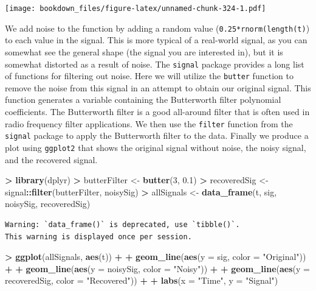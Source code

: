 \documentclass[]{krantz}
\makeatletter
\newenvironment{Shaded}{\begin{snugshade}}{\end{snugshade}}
\newcommand{\KeywordTok}[1]{\textcolor[rgb]{0.27,0.27,0.27}{\textbf{#1}}}
\newcommand{\DataTypeTok}[1]{\textcolor[rgb]{0.27,0.27,0.27}{#1}}
\newcommand{\DecValTok}[1]{\textcolor[rgb]{0.06,0.06,0.06}{#1}}
\newcommand{\FloatTok}[1]{\textcolor[rgb]{0.06,0.06,0.06}{#1}}
\newcommand{\StringTok}[1]{\textcolor[rgb]{0.5,0.5,0.5}{#1}}
\newcommand{\OperatorTok}[1]{\textcolor[rgb]{0.43,0.43,0.43}{\textbf{#1}}}
\newcommand{\NormalTok}[1]{#1}
\newenvironment{kframe}{%
\medskip{}
\setlength{\fboxsep}{.8em}
 \def\at@end@of@kframe{}%
 \ifinner\ifhmode%
  \def\at@end@of@kframe{\end{minipage}}%
  \begin{minipage}{\columnwidth}%
 \fi\fi%
 \def\FrameCommand##1{\hskip\@totalleftmargin \hskip-\fboxsep
 \colorbox{shadecolor}{##1}\hskip-\fboxsep
     \hskip-\linewidth \hskip-\@totalleftmargin \hskip\columnwidth}%
 \MakeFramed {\advance\hsize-\width
   \@totalleftmargin\z@ \linewidth\hsize
   \@setminipage}}%
 {\par\unskip\endMakeFramed%
 \at@end@of@kframe}
\renewenvironment{Shaded}{\begin{kframe}}{\end{kframe}}
\makeatother
\begin{document}
\texttt{[image: bookdown\_files/figure-latex/unnamed-chunk-324-1.pdf]}

We add noise to the function by adding a random value
(\texttt{0.25*rnorm(length(t)}) to each value in the signal. This is
more typical of a real-world signal, as you can somewhat see the general
shape (the signal you are interested in), but it is somewhat distorted
as a result of noise. The \texttt{signal} package provides a long list
of functions for filtering out noise. Here we will utilize the
\texttt{butter} function to remove the noise from this signal in an
attempt to obtain our original signal. This function generates a
variable containing the Butterworth filter polynomial coefficients. The
Butterworth filter is a good all-around filter that is often used in
radio frequency filter applications. We then use the \texttt{filter}
function from the \texttt{signal} package to apply the Butterworth
filter to the data. Finally we produce a plot using \texttt{ggplot2}
that shows the original signal without noise, the noisy signal, and the
recovered signal.

\begin{Shaded}
\begin{Highlighting}[]
\OperatorTok{>}\StringTok{ }\KeywordTok{library}\NormalTok{(dplyr)}
\OperatorTok{>}\StringTok{ }\NormalTok{butterFilter <-}\StringTok{ }\KeywordTok{butter}\NormalTok{(}\DecValTok{3}\NormalTok{, }\FloatTok{0.1}\NormalTok{)}
\OperatorTok{>}\StringTok{ }\NormalTok{recoveredSig <-}\StringTok{ }\NormalTok{signal}\OperatorTok{::}\KeywordTok{filter}\NormalTok{(butterFilter, noisySig)}
\OperatorTok{>}\StringTok{ }\NormalTok{allSignals <-}\StringTok{ }\KeywordTok{data_frame}\NormalTok{(t, sig, noisySig, recoveredSig)}
\end{Highlighting}
\end{Shaded}

\begin{verbatim}
Warning: `data_frame()` is deprecated, use `tibble()`.
This warning is displayed once per session.
\end{verbatim}

\begin{Shaded}
\begin{Highlighting}[]
\OperatorTok{>}\StringTok{ }\KeywordTok{ggplot}\NormalTok{(allSignals, }\KeywordTok{aes}\NormalTok{(t)) }\OperatorTok{+}\StringTok{ }
\OperatorTok{+}\StringTok{   }\KeywordTok{geom_line}\NormalTok{(}\KeywordTok{aes}\NormalTok{(}\DataTypeTok{y =}\NormalTok{ sig, }\DataTypeTok{color =} \StringTok{"Original"}\NormalTok{)) }\OperatorTok{+}\StringTok{ }
\OperatorTok{+}\StringTok{   }\KeywordTok{geom_line}\NormalTok{(}\KeywordTok{aes}\NormalTok{(}\DataTypeTok{y =}\NormalTok{ noisySig, }\DataTypeTok{color =} \StringTok{"Noisy"}\NormalTok{)) }\OperatorTok{+}\StringTok{ }
\OperatorTok{+}\StringTok{   }\KeywordTok{geom_line}\NormalTok{(}\KeywordTok{aes}\NormalTok{(}\DataTypeTok{y =}\NormalTok{ recoveredSig, }\DataTypeTok{color =} \StringTok{"Recovered"}\NormalTok{)) }\OperatorTok{+}\StringTok{ }
\OperatorTok{+}\StringTok{   }\KeywordTok{labs}\NormalTok{(}\DataTypeTok{x =} \StringTok{"Time"}\NormalTok{, }\DataTypeTok{y =} \StringTok{"Signal"}\NormalTok{)}
\end{Highlighting}
\end{Shaded}
\end{document}
